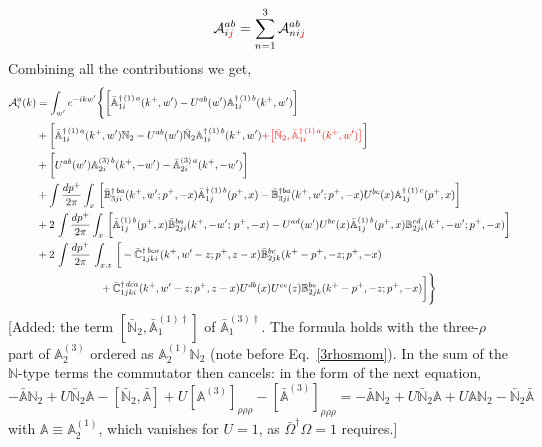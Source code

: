 \documentclass[aps,prd,amsmath,amssymb,nofootinbib]{revtex4-2}
\def\mf#1{\mathbb{#1}}
\numberwithin{equation}{section}
\begin{document}
\begin{align}
    {\cal A}^{ab}_{i{\color{red}j}} = \sum_{n=1}^3 {\cal A}^{ab}_{n i{\color{red}j}} 
\end{align}
Combining all the contributions we get,
    \begin{align}
         {\cal A}^{a}_{i}(k) & = \int_{w^{\prime}}e^{-ikw^{\prime}} \Bigg\{\bigg[\bar{\mf{A}}^{\dagger\,(1)\,a}_{1i}(k^{+},w^{\prime})-U^{ab}(w^{\prime})\mf{A}^{\dagger\, (1)\, b}_{1i}(k^{+},
         w^{\prime})\bigg]\notag \\ & +\bigg[\bar{\mf{A}}^{\dagger\,(1)\,a}_{1i}(k^{+},w^{\prime})\mf{N}_{2} -U^{ab}(w^{\prime})\bar{\mf{N}}_{2}\mf{A}^{\dagger\, (1)\, b}_{1i}(k^{+},w^{\prime}){\color{red}+\big[\bar{\mf{N}}_{2},\bar{\mf{A}}^{\dagger\,(1)\,a}_{1i}(k^{+},w^{\prime})\big]}\bigg]\notag 
         \\ & +\bigg[U^{ab}(w^{\prime})\mf{A}^{(3)\, b}_{2i}(k^{+},- w^{\prime})-\Bar{\mf{A}}^{(3)\, a}_{2i}(k^{+}, - w^{\prime})\bigg]\notag 
         \\ & 
         +\int \frac{dp^{+}}{2\pi}\int_{x}\,\bigg[\Bar{\mf{B}}^{\dagger\, ba}_{3ji}(k^{+}, w^{\prime}; p^{+}, -x)\Bar{\mf{A}}^{\dagger\, (1)\,b}_{1j}(p^{+}, x)
         -\Bar{\mf{B}}^{\dagger ba}_{3ji}(k^{+},w^{\prime}; p^{+},-x) U^{bc}(x) \mf{A}^{\dagger\,(1)\, c}_{1j}(p^{+},x)\bigg]\notag
         \\ & 
         +2\,\int \frac{dp^{+}}{2\pi}\int_{x}\,\bigg[ \Bar{\mf{A}}^{(1)\, b}_{1j}(p^{+}, x)\Bar{\mf{B}}^{ba}_{2ji}(k^{+},-w^{\prime};\,p^{+}, -x) -U^{ad}(w^\prime)U^{bc}(x) \bar{\mf{A}}^{(1)\, b}_{1j}(p^+,x) {\mf{B}}^{cd}_{2ji} (k^+, -w^\prime;p^+, -x)\bigg]\notag 
         \\ & 
         +2\, \int \frac{dp^{+}}{2\pi}\,\int_{x,z}\, \bigg[-\Bar{\mf{C}}^{\dagger\, bca}_{1jki}(k^{+},w^{\prime}-z;p^{+},z-x)\Bar{\mf{B}}^{bc}_{2jk}(k^{+}-p^{+},- z;p^{+},-x)
         \notag \\ & \qquad \qquad \qquad  +\bar{\mf{C}}^{\dagger\, dca}_{1jki}(k^+,w^\prime-z; p^+, z-x)  
                 U^{db}(x)
                 U^{ce}(z) 
                {\mf{B}}^{be}_{2jk} (k^{+}-p^+, -z; p^+, -x) \bigg] \Bigg\}
   \end{align} {\color{red}[Added: the term $[\bar{\mf{N}}_2,\bar{\mf{A}}^{(1)\dagger}_1]$ of $\bar{\mf{A}}^{(3)\dagger}_1$. The formula holds with the three-$\rho$ part of $\mf{A}^{(3)}_2$ ordered as $\mf{A}^{(1)}_2\mf{N}_2$ (note before Eq.~\eqref{3rhosmom}). In the sum of the $\mf{N}$-type terms the commutator then cancels: in the form of the next equation, $-\bar{\mf{A}}\mf{N}_2+U\bar{\mf{N}}_2\mf{A}-[\bar{\mf{N}}_2,\bar{\mf{A}}]+U[\mf{A}^{(3)}]_{\rho\rho\rho}-[\bar{\mf{A}}^{(3)}]_{\rho\rho\rho}=-\bar{\mf{A}}\mf{N}_2+U\bar{\mf{N}}_2\mf{A}+U\mf{A}\mf{N}_2-\bar{\mf{N}}_2\bar{\mf{A}}$ with $\mf{A}\equiv\mf{A}^{(1)}_2$, which vanishes for $U=1$, as $\bar\Omega^\dagger\Omega=1$ requires.]}\par\noindent 
\end{document}
